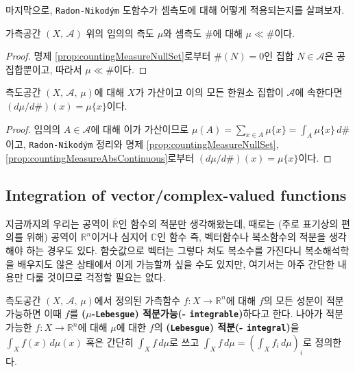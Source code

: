 마지막으로, \texttt{Radon-Nikod\'ym} 도함수가 셈측도에 대해 어떻게 적용되는지를 살펴보자.

\begin{proposition}\label{prop:countingMeasureAbsContinuous}
    가측공간 $(X,\,\mathcal{A})$ 위의 임의의 측도 $\mu$와 셈측도 $\#$에 대해 $\mu\ll\#$이다.
\end{proposition}

\begin{proof}
    명제 \ref{prop:countingMeasureNullSet}로부터 $\#(N)=0$인 집합 $N\in\mathcal{A}$은 공집합뿐이고, 따라서 $\mu\ll\#$이다.
\end{proof}

\begin{theorem}
    측도공간 $(X,\,\mathcal{A},\,\mu)$에 대해 $X$가 가산이고 이의 모든 한원소 집합이 $\mathcal{A}$에 속한다면 $(d\mu/d\#)(x)=\mu\{x\}$이다.
\end{theorem}

\begin{proof}
    임의의 $A\in\mathcal{A}$에 대해 이가 가산이므로 $\mu(A)=\sum_{x\in A}\mu\{x\}=\int_A\mu\{x\}\,d\#$이고, \texttt{Radon-Nikod\'ym} 정리와 명제 \ref{prop:countingMeasureNullSet}, \ref{prop:countingMeasureAbsContinuous}로부터 $(d\mu/d\#)(x)=\mu\{x\}$이다.
\end{proof}

\subsection{Integration of vector/complex-valued functions}

지금까지의 우리는 공역이 $\overline{\mathbb{R}}$인 함수의 적분만 생각해왔는데, 때로는 (주로 표기상의 편의를 위해) 공역이 $\mathbb{R}^n$이거나 심지어 $\mathbb{C}$인 함수 즉, 벡터함수나 복소함수의 적분을 생각해야 하는 경우도 있다. 함숫값으로 벡터는 그렇다 쳐도 복소수를 가진다니 복소해석학을 배우지도 않은 상태에서 이게 가능할까 싶을 수도 있지만, 여기서는 아주 간단한 내용만 다룰 것이므로 걱정할 필요는 없다.

\begin{definition}
    측도공간 $(X,\,\mathcal{A},\,\mu)$에서 정의된 가측함수 $f:X\to\mathbb{R}^n$에 대해 $f$의 모든 성분이 적분가능하면 이때 $f$를 \textbf{($\mu$-\texttt{Lebesgue}) 적분가능(- \texttt{integrable})}하다고 한다. 나아가 적분가능한 $f:X\to\mathbb{R}^n$에 대해 $\mu$에 대한 $f$의 \textbf{(\texttt{Lebesgue}) 적분(- \texttt{integral})}을 $\int_Xf(x)\,d\mu(x)$ 혹은 간단히 $\int_Xf\,d\mu$로 쓰고 $\int_Xf\,d\mu=(\int_Xf_i\,d\mu)_i$로 정의한다.
\end{definition}

